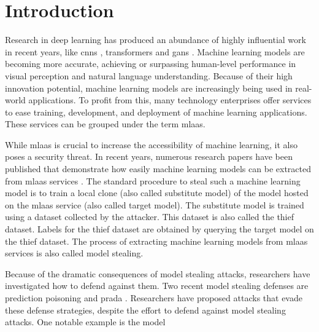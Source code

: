 
\chapter{Introduction}
\label{ch:Introduction}

Research in deep learning has produced an abundance of highly influential work in recent years, like
\glspl{cnn} \cite{lecun1998gradient}, transformers \cite{vaswani2017attention} and \glspl{gan} \cite{goodfellow2020generative}.
Machine learning models are becoming more accurate, achieving or surpassing human-level performance in visual
perception and natural language understanding. Because of their high innovation potential, machine learning models are increasingly
being used in real-world applications. To profit from this, many technology
enterprises offer services to ease training, development, and deployment of machine learning applications. These services can
be grouped under the term \gls{mlaas}. \par
While \gls{mlaas} is crucial to increase the accessibility of machine learning, it also poses a security threat. In recent years, numerous research papers
have been published that demonstrate how easily machine learning models can be extracted from \gls{mlaas} services \parencite{tramer2016stealing,
reith2019efficiently,papernot2017practical}. The standard procedure to steal such a machine learning model is to train a local
clone (also called substitute model) of the model hosted on the \gls{mlaas} service (also called target model). The substitute model is trained
using a dataset collected by the attacker. This dataset is also called the thief dataset. Labels for the thief dataset are obtained by querying the target
model on the thief dataset. The process of extracting machine learning models from \gls{mlaas} services is also called model stealing. \par
Because of the dramatic consequences of model stealing attacks, researchers have investigated how to defend against them. Two recent model stealing
defenses are prediction poisoning \cite{orekondy2019prediction} and \gls{prada} \cite{juuti2019prada}. Researchers have proposed attacks that evade
these defense strategies, despite the effort to
defend against model stealing attacks. One notable example is the model

